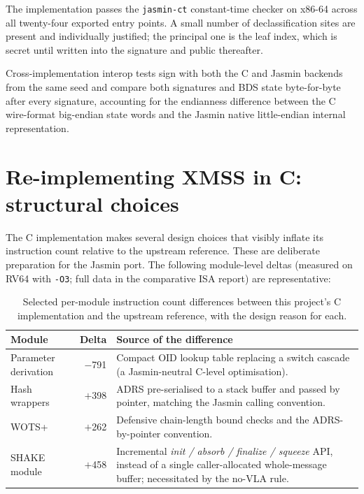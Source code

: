 \documentclass[11pt,a4paper]{article}
\begin{document}
The implementation passes the \texttt{jasmin-ct} constant-time
checker on x86-64 across all twenty-four exported entry points. A
small number of declassification sites are present and individually
justified; the principal one is the leaf index, which is secret
until written into the signature and public thereafter.

Cross-implementation interop tests sign with both the C and Jasmin
backends from the same seed and compare both signatures and BDS
state byte-for-byte after every signature, accounting for the
endianness difference between the C wire-format big-endian state
words and the Jasmin native little-endian internal representation.

\section{Re-implementing XMSS in C: structural choices}

The C implementation makes several design choices that visibly
inflate its instruction count relative to the upstream reference.
These are deliberate preparation for the Jasmin port. The following
module-level deltas (measured on RV64 with \texttt{-O3}; full data
in the comparative ISA report) are representative:

\begin{table}[ht]
\centering
\caption{Selected per-module instruction count differences between
  this project's C implementation and the upstream reference, with
  the design reason for each.}
\label{tab:tax}
\begin{tabularx}{\linewidth}{@{}lrX@{}}
\toprule
Module                & Delta & Source of the difference \\
\midrule
Parameter derivation  & $-$791 & Compact OID lookup table replacing a switch cascade (a Jasmin-neutral C-level optimisation). \\
Hash wrappers         & $+$398 & ADRS pre-serialised to a stack buffer and passed by pointer, matching the Jasmin calling convention. \\
WOTS+                 & $+$262 & Defensive chain-length bound checks and the ADRS-by-pointer convention. \\
SHAKE module          & $+$458 & Incremental \emph{init / absorb / finalize / squeeze} API, instead of a single caller-allocated whole-message buffer; necessitated by the no-VLA rule. \\
\bottomrule
\end{tabularx}
\end{table}
\end{document}
